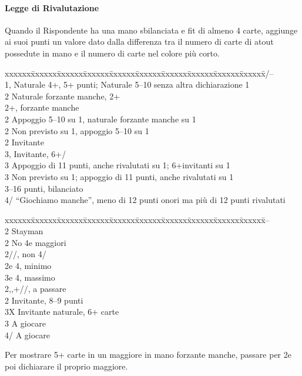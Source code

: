 \documentclass[a4paper,italian,12pt]{article}
\newcommand\SA{{\smaller{SA}}\xspace}
\newenvironment{bidtable}
{\begin{tabbing}

    xxxxxx\=xxxxxx\=xxxxxx\=xxxxxx\=xxxxxx\=xxxxxx\=xxxxxx\=xxxxxx\=xxxxxx\=xxxxxx\=\kill}
{\end{tabbing} }%
\begin{document}
\paragraph{Legge di Rivalutazione}
Quando il Rispondente ha una mano sbilanciata e fit di almeno 4 carte, aggiunge ai suoi punti un valore dato dalla
differenza tra il numero di carte di atout possedute in mano e il numero di carte nel colore più corto.

\begin{bidtable}
    1\He/\Sp--\+\\
    1\Sp,\SA \> \> Naturale 4+\Sp, 5+ punti; Naturale 5--10 senza altra dichiarazione 1\SA\\
    2\Cl \>\> Naturale forzante manche, 2+\Cl\\
    2\Di \>+\Di, forzante manche\\
    2\He \>\> Appoggio 5--10 su 1\He, naturale forzante manche su 1\Sp\\
    2\Sp\>\> Non previsto su 1\He, appoggio 5--10 su 1\Sp\\
    2\SA \>\> Invitante\\
    3\Cl,\Di \>\> Invitante, 6+\Cl/\Di\\
    3\He \>\> Appoggio di 11 punti, anche rivalutati su 1\He; 6+\He invitanti su 1\Sp\\
    3\Sp \>\> Non previsto su 1\He; appoggio di 11 punti, anche rivalutati su 1\Sp\\
    3\SA \>--16 punti, bilanciato\\
    4\He/\Sp \>\> ``Giochiamo manche'', meno di 12 punti onori ma più di 12 punti rivalutati
\end{bidtable}
\newpage

\begin{bidtable}
    1\SA--\+\\
    2\Cl\>\> Stayman\+\+\\
    2\Di\> No 4e maggiori\\
    2\He/\Sp {}\He/\Sp, non 4\Sp/\He\\
    2\SA {}\He e 4\Sp, minimo\\
    3\Cl {}\He e 4\Sp, massimo\-\-\\
    2\Di,\He,\Sp \>+\Di/\He/\Sp, a passare\\
    2\SA \>\> Invitante, 8--9 punti\\
    3X \>\> Invitante naturale, 6+ carte\\
    3\SA \>\> A giocare\\
    4\He/\Sp \>\> A giocare
\end{bidtable}
Per mostrare 5+ carte in un maggiore in mano forzante manche, passare per 2\Cl e poi dichiarare il proprio maggiore.
\end{document}
